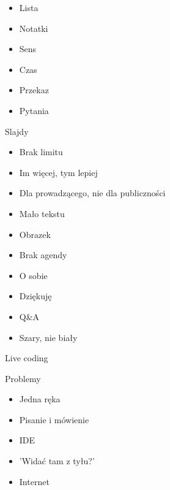 \documentclass{beamer}
\begin{document}
\begin{frame}{}
	\begin{Large}
		\begin{itemize}
			\item Lista
			\item Notatki
			\item Sens
			\item Czas
			\item Przekaz
			\item Pytania
		\end{itemize}
	\end{Large}
\end{frame}

\begin{frame}{}
	\begin{center}
		\Huge{Slajdy}
	\end{center}
\end{frame}

\begin{frame}{}
	\begin{Large}
		\begin{itemize}
			\item Brak limitu
			\item Im więcej, tym lepiej
			\item Dla prowadzącego, nie dla publiczności
			\item Mało tekstu
			\item Obrazek
			\item Brak agendy
			\item O sobie
			\item Dziękuję
			\item Q\&A
			\item Szary, nie biały
		\end{itemize}
	\end{Large}
\end{frame}

\begin{frame}{}
	\begin{center}
		\Huge{Live coding}
	\end{center}
\end{frame}

\begin{frame}{}
	\begin{center}
		\Huge{Problemy}
	\end{center}
\end{frame}

\begin{frame}{}
	\begin{Large}
		\begin{itemize}
			\item Jedna ręka
			\item Pisanie i mówienie
			\item IDE
			\item 'Widać tam z tyłu?'
			\item Internet
		\end{itemize}
	\end{Large}
\end{frame}
\end{document}
